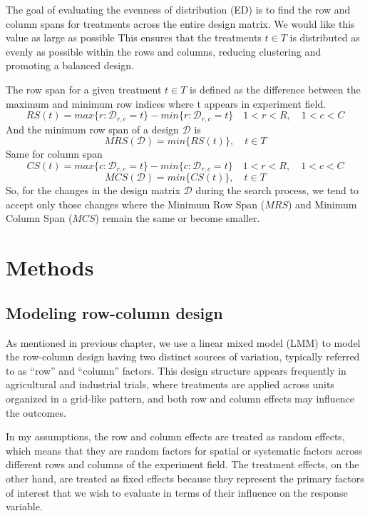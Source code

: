 \documentclass[
  a4paper,
  oneside,
  openany,
  12pt,
  onecolumn]{book}
\theoremstyle{definition}
\theoremstyle{plain}
\theoremstyle{remark}
\begin{document}
The goal of evaluating the evenness of distribution (ED) is to find the
row and column spans for treatments across the entire design matrix. We
would like this value as large as possible This ensures that the
treatments \(t\in T\) is distributed as evenly as possible within the
rows and columns, reducing clustering and promoting a balanced design.

The row span for a given treatment \(t \in T\) is defined as the
difference between the maximum and minimum row indices where t appears
in experiment field. \[
RS(t)=max\{r:\mathcal{D}_{r,c}=t\}-min\{r:\mathcal{D}_{r,c}=t\} \quad 1<r<R,\quad 1<c<C
\] And the minimum row span of a design \(\mathcal{D}\) is \[
MRS(\mathcal{D})=min\{RS(t)\},\quad t \in T
\] Same for column span \[
CS(t)=max\{c:\mathcal{D}_{r,c}=t\}-min\{c:\mathcal{D}_{r,c}=t\} \quad 1<r<R,\quad 1<c<C
\] \[
MCS(\mathcal{D})=min\{CS(t)\},\quad t \in T
\] So, for the changes in the design matrix \(\mathcal{D}\) during the
search process, we tend to accept only those changes where the Minimum
Row Span (\(MRS\)) and Minimum Column Span (\(MCS\)) remain the same or
become smaller.


\chapter{Methods}\label{sec-methods}

\section{Modeling row-column design}\label{modeling-row-column-design}

As mentioned in previous chapter, we use a linear mixed model (LMM) to
model the row-column design having two distinct sources of variation,
typically referred to as ``row'' and ``column'' factors. This design
structure appears frequently in agricultural and industrial trials,
where treatments are applied across units organized in a grid-like
pattern, and both row and column effects may influence the outcomes.

In my assumptions, the row and column effects are treated as random
effects, which means that they are random factors for spatial or
systematic factors across different rows and columns of the experiment
field. The treatment effects, on the other hand, are treated as fixed
effects because they represent the primary factors of interest that we
wish to evaluate in terms of their influence on the response variable.
\end{document}
